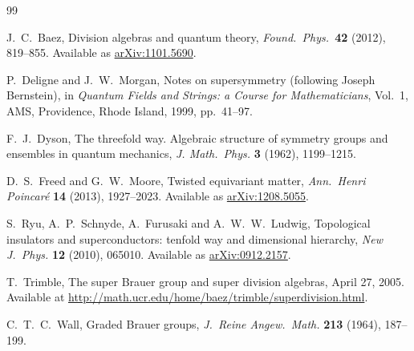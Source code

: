 \documentclass[]{amsart}
\newcommand{\maps}{\colon}    %
\newcommand{\Z}{{\mathbb Z}}  %
\newcommand{\GL}{{\rm{GL}}}     %
\theoremstyle{definition}
\begin{document}

\begin{thebibliography}{99}

J.\ C.\ Baez, Division algebras and quantum theory, 
\textsl{Found.\ Phys.\ }\textbf{42} (2012), 819--855.   Available as
\href{https://arxiv.org/abs/1101.5690}{arXiv:1101.5690}.

P.\ Deligne and J.\ W.\ Morgan, Notes on supersymmetry 
(following Joseph Bernstein), in \textsl{Quantum Fields and Strings: a Course for 
Mathematicians}, Vol.\ 1, AMS, Providence, Rhode Island, 1999, pp.\ 41--97.

F.\ J.\ Dyson, The threefold way. Algebraic structure of symmetry groups 
and ensembles in quantum mechanics, \textsl{J. Math.\ Phys.} \textbf{3} (1962), 
1199--1215.

D.\ S.\ Freed and G.\ W.\ Moore, Twisted equivariant matter, 
\textsl{Ann.\ Henri Poincar\'e} \textbf{14} (2013), 1927--2023.  Available
as \href{https://arxiv.org/abs/1208.5055}{arXiv:1208.5055}.


S.\ Ryu, A.\ P.\ Schnyde, A.\ Furusaki and A.\ W.\ W.\ Ludwig, Topological insulators and superconductors: tenfold way and dimensional hierarchy, 
\textsl{New J.\ Phys.} \textbf{12} (2010), 065010.  Available as 
\href{https://arxiv.org/abs/0912.2157}{arXiv:0912.2157}.

T.\ Trimble,  The super Brauer group and super division algebras, April 27, 2005. 
Available at \href{http://math.ucr.edu/home/baez/trimble/superdivision.html}{http://math.ucr.edu/home/baez/trimble/superdivision.html}.

C.\ T.\ C.\ Wall, Graded Brauer groups, \textsl{J.\ Reine Angew.\ Math.}
\textbf{213} (1964), 187--199. 

\end{thebibliography}
\end{document}
